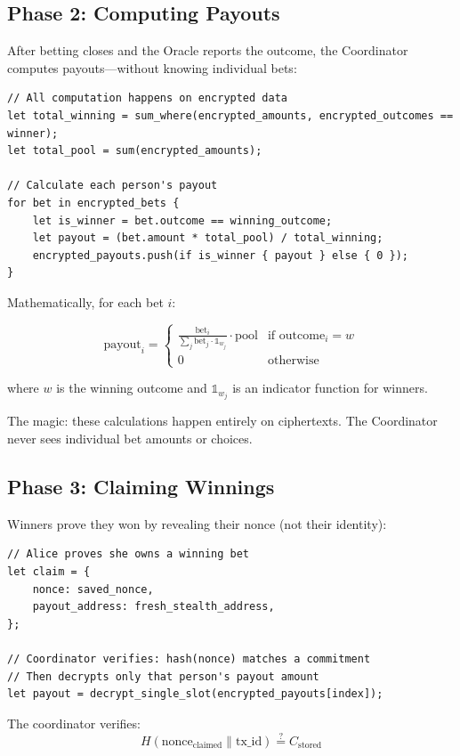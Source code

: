 \documentclass{article}
\begin{document}
\subsection{Phase 2: Computing Payouts}

After betting closes and the Oracle reports the outcome, the Coordinator computes payouts---without knowing individual bets:

\begin{verbatim}
// All computation happens on encrypted data
let total_winning = sum_where(encrypted_amounts, encrypted_outcomes == winner);
let total_pool = sum(encrypted_amounts);

// Calculate each person's payout
for bet in encrypted_bets {
    let is_winner = bet.outcome == winning_outcome;
    let payout = (bet.amount * total_pool) / total_winning;
    encrypted_payouts.push(if is_winner { payout } else { 0 });
}
\end{verbatim}

Mathematically, for each bet $i$:

$$\text{payout}_i = \begin{cases}
\frac{\text{bet}_i}{\sum_j \text{bet}_j \cdot \mathbb{1}_{w_j}} \cdot \text{pool} & \text{if } \text{outcome}_i = w \\
0 & \text{otherwise}
\end{cases}$$

where $w$ is the winning outcome and $\mathbb{1}_{w_j}$ is an indicator function for winners.

The magic: these calculations happen entirely on ciphertexts. The Coordinator never sees individual bet amounts or choices.

\subsection{Phase 3: Claiming Winnings}

Winners prove they won by revealing their nonce (not their identity):

\begin{verbatim}
// Alice proves she owns a winning bet
let claim = {
    nonce: saved_nonce,
    payout_address: fresh_stealth_address,
};

// Coordinator verifies: hash(nonce) matches a commitment
// Then decrypts only that person's payout amount
let payout = decrypt_single_slot(encrypted_payouts[index]);
\end{verbatim}

The coordinator verifies:
$$H(\text{nonce}_{\text{claimed}} \| \text{tx\_id}) \stackrel{?}{=} C_{\text{stored}}$$
\end{document}
